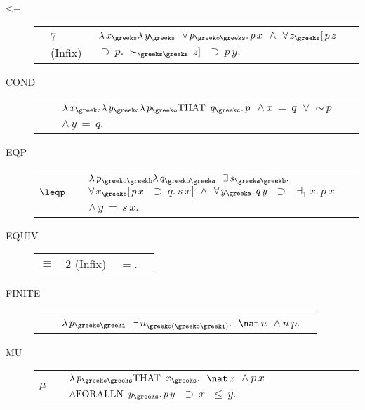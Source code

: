 \begin{description} 
\item[<=] \index{<=} \begin{tabular}{l l l l}
&7 (Infix)&\texttt{$ \lambda \,x_{\greeks} \lambda \,y_{\greeks} $ $\forall \,p_{\greeko\greeks} . \,p \,x $ $\land $ $\forall \,z_{\greeks} [ \,p \,z $ $\supset \,p . $ $\succ_{\greeks\greeks} \,z ] $ $\supset \,p \,y$}. \\ 
\end{tabular}

\item[COND]  \begin{tabular}{l l l l}
&&\texttt{$ \lambda \,x_{\greekc} \lambda \,y_{\greekc} \lambda \,p_{\greeko} \hbox{THAT } \,q_{\greekc} . \,p $ $\land \,x \,= \,q $ $\lor $ $\sim \,p $ $\land \,y \,= \,q$}. \\ 
\end{tabular}

\item[EQP]  \begin{tabular}{l l l l}
\texttt{$\leqp$}&&\texttt{$ \lambda \,p_{\greeko\greekb} \lambda \,q_{\greeko\greeka} $ $\exists \,s_{\greeka\greekb} . $ $\forall \,x_{\greekb} [ \,p \,x $ $\supset \,q . \,s \,x ] $ $\land $ $\forall \,y_{\greeka} . \,q \,y $ $\supset \,$ $\exists_{1} \,x . \,p \,x $ $\land \,y \,= \,s \,x$}. \\ 
\end{tabular}

\item[EQUIV]  \begin{tabular}{l l l l}
\texttt{$\equiv$}&2 (Infix)&\texttt{$ \,=$}. \\ 
\end{tabular}

\item[FINITE]  \begin{tabular}{l l l l}
&&\texttt{$ \lambda \,p_{\greeko\greeki} $ $\exists \,n_{\greeko(\greeko\greeki)} . $ $\nat \,n $ $\land \,n \,p$}. \\ 
\end{tabular}

\item[MU]  \begin{tabular}{l l l l}
\texttt{$\mu$}&&\texttt{$ \lambda \,p_{\greeko\greeks} \hbox{THAT } \,x_{\greeks} . $ $\nat \,x $ $\land \,p \,x $ $\land \hbox{FORALLN } \,y_{\greeks} . \,p \,y $ $\supset \,x $ $\leq \,y$}. \\ 
\end{tabular}


\end{description}

